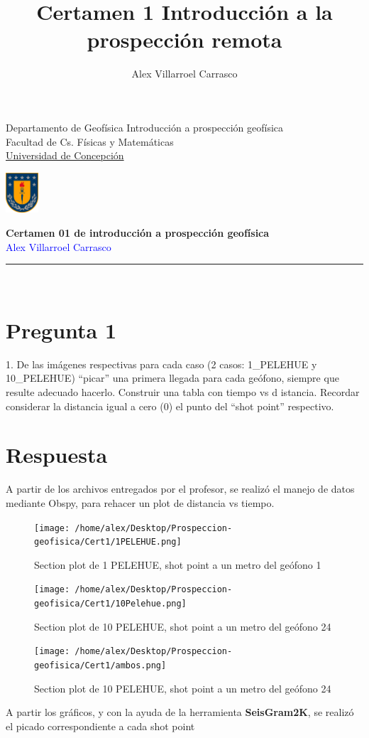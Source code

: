 \documentclass{article}
\title{Certamen 1 Introducción a la prospección remota}
\author{Alex Villarroel Carrasco}
\theoremstyle{mytheoremstyle}
\theoremstyle{mytheoremstyle}
\theoremstyle{myproblemstyle}
\begin{document}
\usetikzlibrary{positioning}
	\pagestyle{plain}
	\begin{flushleft}
		Departamento de Geofísica \hfill Introducción a prospección geofísica\\
		Facultad de Cs. Físicas y Matemáticas\\
		\underline{Universidad de Concepción}
	\end{flushleft}
	
	\begin{flushright}\vspace{-5mm}
		\includegraphics[height=1.5cm]{escudo.png}
	\end{flushright}
	
	\begin{center}\vspace{-1cm}
		\textbf{\large Certamen 01 de introducción a prospección geofísica}\\
		{\textcolor{blue}{Alex Villarroel Carrasco}}\\
	\end{center}
	\rule{\linewidth}{0.1mm}
	\\
    \section*{Pregunta 1}
	 1. De las imágenes respectivas para cada caso (2 casos: 1\_PELEHUE y 10\_PELEHUE)
		“picar” una primera llegada para cada geófono, siempre que resulte adecuado
		hacerlo. Construir una tabla con tiempo vs d istancia. Recordar considerar la
		distancia igual a cero (0) el punto del “shot point” respectivo.
	\section*{Respuesta}
	A partir de los archivos entregados por el profesor, se realizó el manejo de datos mediante Obspy, para rehacer un plot de distancia vs tiempo.
	\begin{figure}[h]
		\texttt{[image: /home/alex/Desktop/Prospeccion-geofisica/Cert1/1PELEHUE.png]}
		\caption{Section plot de 1 PELEHUE, shot point a un metro del geófono 1}
	\end{figure}
	\begin{figure}[h]
		\texttt{[image: /home/alex/Desktop/Prospeccion-geofisica/Cert1/10Pelehue.png]}
		\caption{Section plot de 10 PELEHUE, shot point a un metro del geófono 24}
	\end{figure}
	\begin{figure}[h]
		\texttt{[image: /home/alex/Desktop/Prospeccion-geofisica/Cert1/ambos.png]}
		\caption{Section plot de 10 PELEHUE, shot point a un metro del geófono 24}
	\end{figure}
	\newpage
	A partir los gráficos, y con la ayuda de la herramienta \textbf{SeisGram2K}, se realizó el picado correspondiente a cada shot point
	\\%
	
\end{document}
